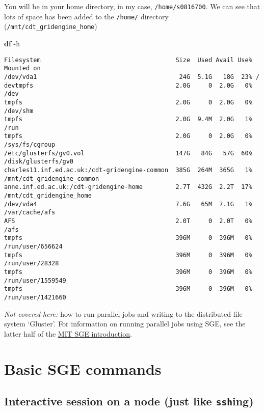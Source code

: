 \documentclass[]{article}
\newenvironment{Shaded}{\begin{snugshade}}{\end{snugshade}}
\newcommand{\KeywordTok}[1]{\textcolor[rgb]{0.13,0.29,0.53}{\textbf{{#1}}}}
\newcommand{\NormalTok}[1]{{#1}}
\begin{document}
You will be in your home directory, in my case, \texttt{/home/s0816700}.
We can see that lots of space has been added to the \texttt{/home/}
directory (\texttt{/mnt/cdt\_gridengine\_home})

\begin{Shaded}
\begin{Highlighting}[]
\KeywordTok{df} \NormalTok{-h}
\end{Highlighting}
\end{Shaded}

\begin{verbatim}
Filesystem                                     Size  Used Avail Use% Mounted on
/dev/vda1                                       24G  5.1G   18G  23% /
devtmpfs                                       2.0G     0  2.0G   0% /dev
tmpfs                                          2.0G     0  2.0G   0% /dev/shm
tmpfs                                          2.0G  9.4M  2.0G   1% /run
tmpfs                                          2.0G     0  2.0G   0% /sys/fs/cgroup
/etc/glusterfs/gv0.vol                         147G   84G   57G  60% /disk/glusterfs/gv0
charles11.inf.ed.ac.uk:/cdt-gridengine-common  385G  264M  365G   1% /mnt/cdt_gridengine_common
anne.inf.ed.ac.uk:/cdt-gridengine-home         2.7T  432G  2.2T  17% /mnt/cdt_gridengine_home
/dev/vda4                                      7.6G   65M  7.1G   1% /var/cache/afs
AFS                                            2.0T     0  2.0T   0% /afs
tmpfs                                          396M     0  396M   0% /run/user/656624
tmpfs                                          396M     0  396M   0% /run/user/28328
tmpfs                                          396M     0  396M   0% /run/user/1559549
tmpfs                                          396M     0  396M   0% /run/user/1421660
\end{verbatim}

\emph{Not covered here:} how to run parallel jobs and writing to the
distributed file system `Gluster'. For information on running parallel
jobs using SGE, see the latter half of the
\href{http://star.mit.edu/cluster/docs/0.92rc2/guides/sge.html}{MIT SGE
introduction}.

\section{Basic SGE commands}\label{basic-sge-commands}

\subsection{Interactive session on a node (just like
\texttt{ssh}ing)}\label{interactive-session-on-a-node-just-like-sshing}
\end{document}

